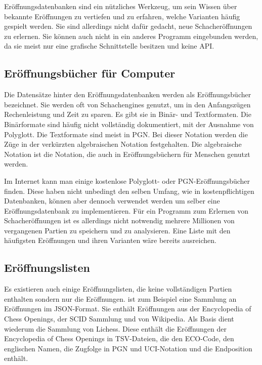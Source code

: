 Eröffnungsdatenbanken sind ein nützliches Werkzeug, um sein Wissen über bekannte Eröffnungen zu vertiefen und zu erfahren, welche Varianten häufig gespielt werden. Sie sind allerdings nicht dafür gedacht, neue Schacheröffnungen zu erlernen. Sie können auch nicht in ein anderes Programm eingebunden werden, da sie meist nur eine grafische Schnittstelle besitzen und keine \ac{API}.

\subsection{Eröffnungsbücher für Computer}
Die Datensätze hinter den Eröffnungsdatenbanken werden als Eröffnungsbücher bezeichnet. Sie werden oft von Schachengines genutzt, um in den Anfangszügen Rechenleistung und Zeit zu sparen. Es gibt sie in Binär- und Textformaten. Die Binärformate sind häufig nicht vollständig dokumentiert, mit der Ausnahme von Polyglott. Die Textformate sind meist in \ac{PGN}.
Bei dieser Notation werden die Züge in der verkürzten algebraischen Notation festgehalten. Die algebraische Notation ist die Notation, die auch in Eröffnungsbüchern für Menschen genutzt werden.
\cite{wikipedia_foundation_inc_chess_2025}

Im Internet kann man einige kostenlose Polyglott- oder PGN-Eröffnungsbücher finden. Diese haben nicht unbedingt den selben Umfang, wie in kostenpflichtigen Datenbanken, können aber dennoch verwendet werden um selber eine Eröffnungsdatenbank zu implementieren. Für ein Programm zum Erlernen von Schacheröffnungen ist es allerdings nicht notwendig mehrere Millionen von vergangenen Partien zu speichern und zu analysieren. Eine Liste mit den häufigsten Eröffnungen und ihren Varianten wäre bereits ausreichen.

\subsection{Eröffnungslisten}
Es existieren auch einige Eröffnungslisten, die keine vollständigen Partien enthalten sondern nur die Eröffnungen. \cite{omur_yanikoglu_ecojson_2025} ist zum Beispiel eine Sammlung an Eröffnungen im JSON-Format. Sie enthält Eröffnungen aus der Encyclopedia of Chess Openings, der SCID Sammlung und von Wikipedia. Als Basis dient wiederum die Sammlung \cite{lichessorg_chess-openings_2025} von Lichess. Diese enthält die Eröffnungen der Encyclopedia of Chess Openings in TSV-Dateien, die den ECO-Code, den englischen Namen, die Zugfolge in \ac{PGN} und \ac{UCI}-Notation und die Endposition enthält.

